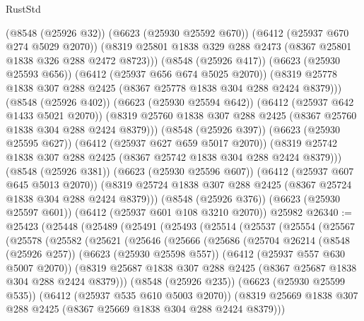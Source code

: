 \begin{lexlean}{RustStd}
\begin{coremodule}
              (@8548 (@25926 @32))
              (@6623 (@25930 @25592 @670))
              (@6412 (@25937 @670 @274 @5029 @2070))
              (@8319 @25801 @1838 @329 @288 @2473 (@8367 @25801 @1838 @326 @288 @2472 @8723)))
            (@8548 (@25926 @417))
            (@6623 (@25930 @25593 @656))
            (@6412 (@25937 @656 @674 @5025 @2070))
            (@8319 @25778 @1838 @307 @288 @2425 (@8367 @25778 @1838 @304 @288 @2424 @8379)))
          (@8548 (@25926 @402))
          (@6623 (@25930 @25594 @642))
          (@6412 (@25937 @642 @1433 @5021 @2070))
          (@8319 @25760 @1838 @307 @288 @2425 (@8367 @25760 @1838 @304 @288 @2424 @8379)))
        (@8548 (@25926 @397))
        (@6623 (@25930 @25595 @627))
        (@6412 (@25937 @627 @659 @5017 @2070))
        (@8319 @25742 @1838 @307 @288 @2425 (@8367 @25742 @1838 @304 @288 @2424 @8379)))
      (@8548 (@25926 @381))
      (@6623 (@25930 @25596 @607))
      (@6412 (@25937 @607 @645 @5013 @2070))
      (@8319 @25724 @1838 @307 @288 @2425 (@8367 @25724 @1838 @304 @288 @2424 @8379)))
    (@8548 (@25926 @376))
    (@6623 (@25930 @25597 @601))
    (@6412 (@25937 @601 @108 @3210 @2070))
    @25982
@26340 := @25423
    (@25448
      (@25489
        (@25491
          (@25493
            (@25514
              (@25537
                (@25554
                  (@25567
                    (@25578
                      (@25582
                        (@25621
                          (@25646
                            (@25666
                              (@25686
                                (@25704
                                  @26214
                                  (@8548 (@25926 @257))
                                  (@6623 (@25930 @25598 @557))
                                  (@6412 (@25937 @557 @630 @5007 @2070))
                                  (@8319
                                    @25687
                                    @1838
                                    @307
                                    @288
                                    @2425
                                    (@8367 @25687 @1838 @304 @288 @2424 @8379)))
                                (@8548 (@25926 @235))
                                (@6623 (@25930 @25599 @535))
                                (@6412 (@25937 @535 @610 @5003 @2070))
                                (@8319
                                  @25669
                                  @1838
                                  @307
                                  @288
                                  @2425
                                  (@8367 @25669 @1838 @304 @288 @2424 @8379)))

\end{coremodule}
\end{lexlean}
